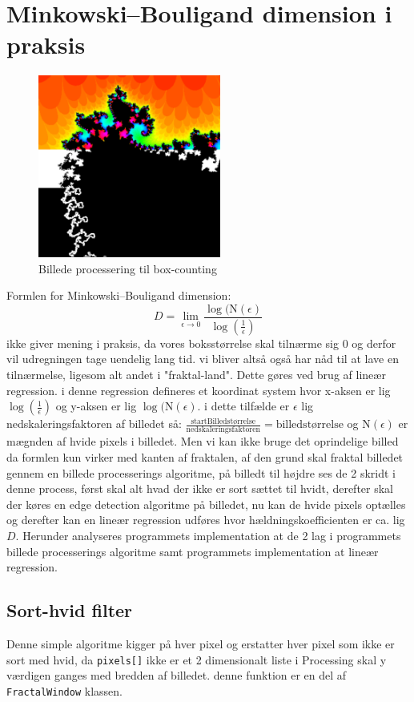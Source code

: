 \documentclass{article}
\begin{document}
\section{Minkowski–Bouligand dimension i praksis}
\begin{figure}
\includegraphics[width=6cm]{dimansion.png}
\caption{Billede processering til box-counting}\label{wrap-fig:idk}
\end{figure}
Formlen for Minkowski–Bouligand dimension: $$D = \lim_{\epsilon\to0} \frac{\log(\text{N}(\epsilon)}{\log(\frac{1}{\epsilon})}$$ ikke giver mening i praksis, da vores boksstørrelse skal tilnærme sig 0 og derfor vil udregningen tage uendelig lang tid. vi bliver altså også har nåd til at lave en tilnærmelse, ligesom alt andet i "fraktal-land". Dette gøres ved brug af lineær regression. i denne regression defineres et koordinat system hvor x-aksen er lig $\log(\frac{1}{\epsilon})$ og y-aksen er lig $\log(\text{N}(\epsilon)$. i dette tilfælde er $\epsilon$ lig nedskaleringsfaktoren af billedet så: $\frac{\text{startBilledstørrelse}}{\text{nedskaleringsfaktoren}}=\text{billedstørrelse}$ og $\text{N}(\epsilon)$ er mægnden af hvide pixels i billedet. Men vi kan ikke bruge det oprindelige billed da formlen kun virker med kanten af fraktalen, af den grund skal fraktal billedet gennem en billede processerings algoritme, på billedt til højdre ses de 2 skridt i denne process, først skal alt hvad der ikke er sort sættet til hvidt, derefter skal der køres en edge detection algoritme på billedet, nu kan de hvide pixels optælles og derefter kan en lineær regression udføres hvor hældningskoefficienten er ca. lig $D$. Herunder analyseres programmets implementation at de 2 lag i programmets billede processerings algoritme samt programmets implementation at lineær regression.
\newpage
\subsection{Sort-hvid filter}

Denne simple algoritme kigger på hver pixel og erstatter hver pixel som ikke er sort med hvid, da \texttt{pixels[]} ikke er et 2 dimensionalt liste i Processing skal y værdigen ganges med bredden af billedet. denne funktion er en del af \texttt{FractalWindow} klassen.\\\\
\end{document}
